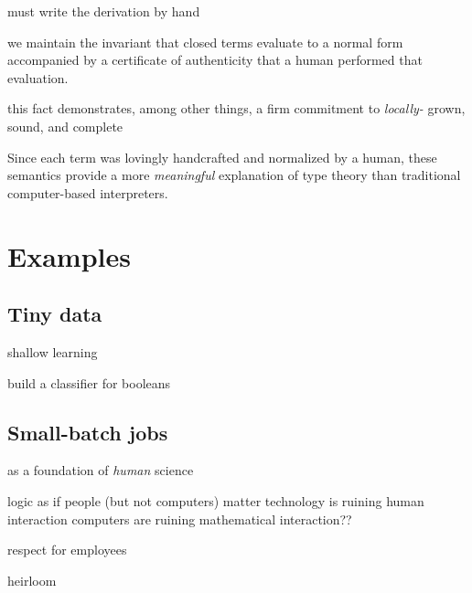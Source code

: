 \documentclass[10pt]{article}
\begin{document}
must write the derivation by hand

we maintain the invariant that closed terms evaluate to a normal form
accompanied by a certificate of authenticity that a human performed that
evaluation.

this fact demonstrates, among other things, a firm commitment to \emph{locally-}
grown, sound, and complete 

Since each term was lovingly handcrafted and normalized by a human, these
semantics provide a more \emph{meaningful} explanation of type theory than
traditional computer-based interpreters.






\section{Examples}

\subsection{Tiny data}

shallow learning

build a classifier for booleans

\subsection{Small-batch jobs}

\vspace{10em}

as a foundation of \emph{human} science

logic as if people (but not computers) matter
technology is ruining human interaction
computers are ruining mathematical interaction??

respect for employees

heirloom

{}

\end{document}
